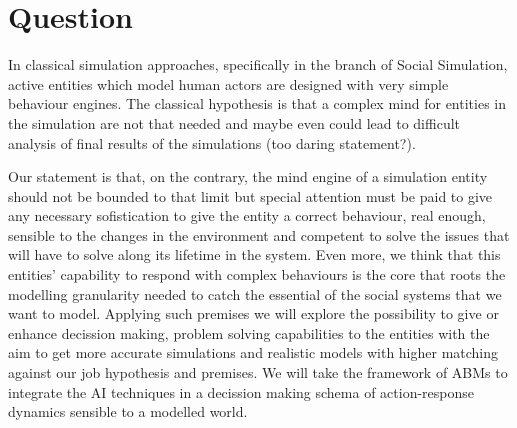\documentclass[11pt,oneside,a4paper,openright]{report}
\begin{document}
%
%
%
%
%
%
%
\section{Question} 

In classical simulation approaches, specifically in the branch of Social Simulation, active entities which model human actors are designed with very simple behaviour engines. The classical hypothesis is that a complex mind for entities in the simulation are not that needed and maybe even could lead to difficult analysis of final results of the simulations (too daring statement?). 

Our statement is that, on the contrary, the mind engine of a simulation entity should not be bounded to that limit but special attention must be paid to give any necessary sofistication to give the entity a correct behaviour, real enough, sensible to the changes in the environment and competent to solve the issues that will have to solve along its lifetime in the system. Even more, we think that this entities' capability to respond with complex behaviours is the core that roots the modelling granularity needed to catch the essential of the social systems that we want to model.
Applying such premises we will explore the possibility to give or enhance decission making, problem solving
capabilities to the entities with the aim to get more accurate simulations and realistic models with higher matching against our job hypothesis and premises. We will take the framework of ABMs to integrate the AI techniques in a decission making schema of action-response dynamics sensible to a modelled world.
\end{document}
